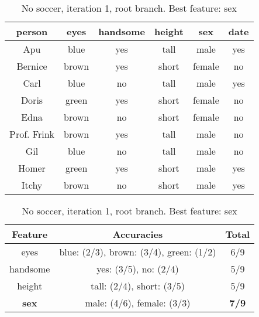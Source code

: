 \begin{table}[h!]
  \centering
  \begin{tabular}{ccccc|c}
    \toprule
    person      & eyes  & handsome & height & sex    & date\\
    \midrule
    Apu         & blue  & yes      & tall   & male   & yes \\
    Bernice     & brown & yes      & short  & female & no  \\
    Carl        & blue  & no       & tall   & male   & yes \\
    Doris       & green & yes      & short  & female & no  \\
    Edna        & brown & no       & short  & female & no  \\
    Prof. Frink & brown & yes      & tall   & male   & no  \\
    Gil         & blue  & no       & tall   & male   & no  \\
    Homer       & green & yes      & short  & male   & yes \\
    Itchy       & brown & no       & short  & male   & yes \\
    \bottomrule
  \end{tabular}

  \vspace{.5cm}

  \begin{tabular}{ccc}
    \toprule
    Feature      & Accuracies                              & Total\\
    \midrule
    eyes         & blue: (2/3), brown: (3/4), green: (1/2) & 6/9\\
    handsome     & yes: (3/5), no: (2/4)                   & 5/9\\
    height       & tall: (2/4), short: (3/5)               & 5/9\\
    \textbf{sex} & male: (4/6), female: (3/3)              & \textbf{7/9}\\
    \bottomrule
  \end{tabular}
  \caption*{No soccer, iteration 1, root branch. Best feature: sex}
\end{table}

